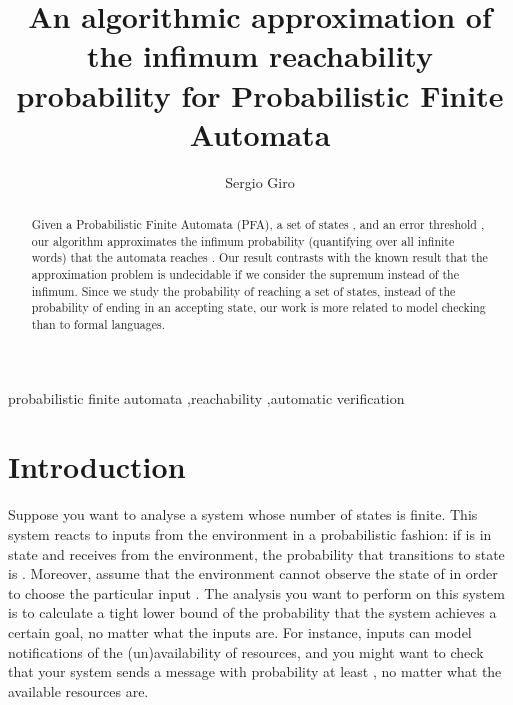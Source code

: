 \documentclass[final,3p,times,twocolumn]{elsarticle}
\theoremstyle{plain}
\theoremstyle{definition}
\begin{document}
\begin{frontmatter}



\title{An algorithmic approximation of the infimum reachability
			probability for Probabilistic Finite Automata}\author{Sergio Giro}\address{FaMAF -- Universidad Nacional de C\'ordoba -- Argentina\\
			FCEIA -- Universidad Nacional de Rosario}













\begin{abstract}
Given a Probabilistic Finite Automata (PFA), a set of states ,
and an error threshold , our algorithm approximates the
infimum probability (quantifying over all infinite words) that the automata
reaches . Our result contrasts with the known result that the
approximation problem is undecidable if we consider the supremum instead of the
infimum. Since we study the probability of reaching a set of states, instead of
the probability of ending in an accepting state, our work is more related to
model checking than to formal languages.
\end{abstract}

\begin{keyword}
probabilistic finite automata \sep reachability \sep automatic verification
\end{keyword}

\end{frontmatter}



\section{Introduction}
\label{}

Suppose you want to analyse a system  whose number of states is finite.
This system reacts to inputs from the environment in
a probabilistic fashion: if  is in state  and receives
 from the environment, the probability that  transitions
to state  is . Moreover, assume that the environment
cannot observe the state of  in order to choose the particular input
. The analysis you want to perform on this system is to calculate a
tight lower bound of the probability that the system achieves a certain goal,
no matter what the inputs are. For instance, inputs can model notifications
of the (un)availability of resources, and you might want to check that your
system sends a message with probability at least , no matter what the
available resources are.
\end{document}
